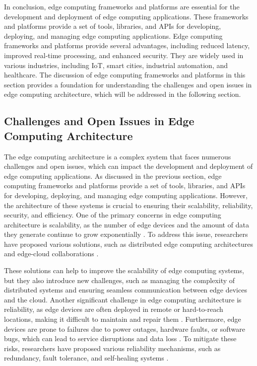 \documentclass[11pt]{article}
\begin{document}
In conclusion, edge computing frameworks and platforms are essential for the development and deployment of edge computing applications. These frameworks and platforms provide a set of tools, libraries, and APIs for developing, deploying, and managing edge computing applications. Edge computing frameworks and platforms provide several advantages, including reduced latency, improved real-time processing, and enhanced security. They are widely used in various industries, including IoT, smart cities, industrial automation, and healthcare. The discussion of edge computing frameworks and platforms in this section provides a foundation for understanding the challenges and open issues in edge computing architecture, which will be addressed in the following section.

\subsection{Challenges and Open Issues in Edge Computing Architecture}

The edge computing architecture is a complex system that faces numerous challenges and open issues, which can impact the development and deployment of edge computing applications. As discussed in the previous section, edge computing frameworks and platforms provide a set of tools, libraries, and APIs for developing, deploying, and managing edge computing applications. However, the architecture of these systems is crucial to ensuring their scalability, reliability, security, and efficiency. One of the primary concerns in edge computing architecture is scalability, as the number of edge devices and the amount of data they generate continue to grow exponentially \cite{ref2}. To address this issue, researchers have proposed various solutions, such as distributed edge computing architectures and edge-cloud collaborations \cite{ref36}.

These solutions can help to improve the scalability of edge computing systems, but they also introduce new challenges, such as managing the complexity of distributed systems and ensuring seamless communication between edge devices and the cloud. Another significant challenge in edge computing architecture is reliability, as edge devices are often deployed in remote or hard-to-reach locations, making it difficult to maintain and repair them \cite{ref18}. Furthermore, edge devices are prone to failures due to power outages, hardware faults, or software bugs, which can lead to service disruptions and data loss \cite{ref37}. To mitigate these risks, researchers have proposed various reliability mechanisms, such as redundancy, fault tolerance, and self-healing systems \cite{ref38}.
\end{document}
